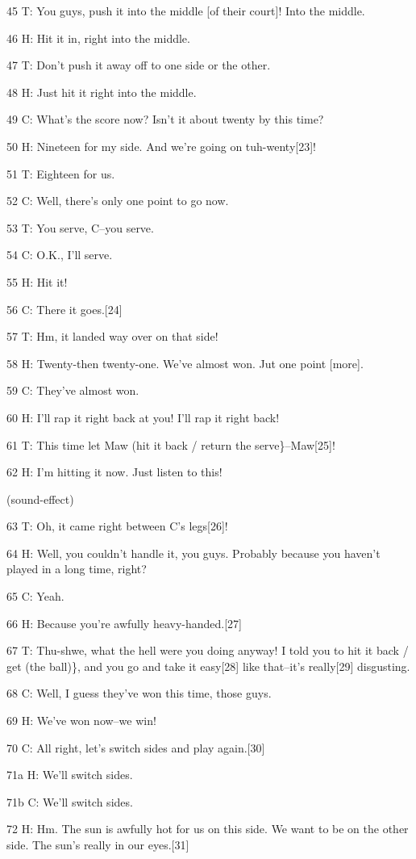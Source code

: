45 T: You guys, push it into the middle [of their court]! Into the middle.

46 H: Hit it in, right into the middle.

47 T: Don't push it away off to one side or the other.

48 H: Just hit it right into the middle.

49 C: What's the score now? Isn't it about twenty by this time?

50 H: Nineteen for my side. And we're going on tuh-wenty[23]!

51 T: Eighteen for us.

52 C: Well, there's only one point to go now.

53 T: You serve, C--you serve.

54 C: O.K., I'll serve.

55 H: Hit it!

56 C: There it goes.[24]

57 T: Hm, it landed way over on that side!

58 H: Twenty-then twenty-one. We've almost won. Jut one point [more].

59 C: They've almost won.

60 H: I'll rap it right back at you! I'll rap it right back!

61 T: This time let Maw (hit it back / return the serve\}--Maw[25]!

62 H: I'm hitting it now. Just listen to this!

(sound-effect)

63 T: Oh, it came right between C's legs[26]!

64 H: Well, you couldn't handle it, you guys. Probably because you haven't played
in a long time, right?

65 C: Yeah.

66 H: Because you're awfully heavy-handed.[27]

67 T: Thu-shwe, what the hell were you doing anyway! I told you to hit it back
/ get (the ball)\}, and you go and take it easy[28] like that--it's really[29]
disgusting.

68 C: Well, I guess they've won this time, those guys.

69 H: We've won now--we win!

70 C: All right, let's switch sides and play again.[30]

71a H: We'll switch sides.

71b C: We'll switch sides.

72 H: Hm. The sun is awfully hot for us on this side. We want to be on the other
side. The sun's really in our eyes.[31]

